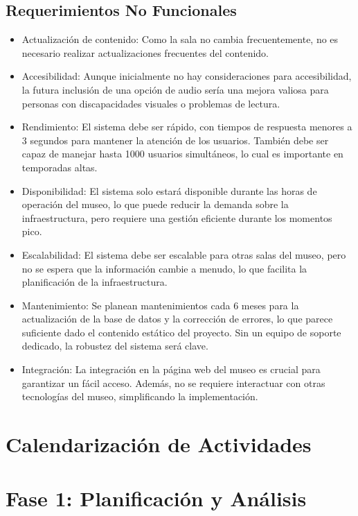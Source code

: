 \documentclass{report}
\begin{document}
    \subsection*{Requerimientos No Funcionales}
    \begin{itemize}
        \item Actualización de contenido: Como la sala no cambia frecuentemente, no es necesario realizar actualizaciones frecuentes del contenido.
        \item Accesibilidad: Aunque inicialmente no hay consideraciones para accesibilidad, la futura inclusión de una opción de audio sería una mejora valiosa para personas con discapacidades visuales o problemas de lectura.
        \item Rendimiento: El sistema debe ser rápido, con tiempos de respuesta menores a 3 segundos para mantener la atención de los usuarios. También debe ser capaz de manejar hasta 1000 usuarios simultáneos, lo cual es importante en temporadas altas.
        \item Disponibilidad: El sistema solo estará disponible durante las horas de operación del museo, lo que puede reducir la demanda sobre la infraestructura, pero requiere una gestión eficiente durante los momentos pico.
        \item Escalabilidad: El sistema debe ser escalable para otras salas del museo, pero no se espera que la información cambie a menudo, lo que facilita la planificación de la infraestructura.
        \item Mantenimiento: Se planean mantenimientos cada 6 meses para la actualización de la base de datos y la corrección de errores, lo que parece suficiente dado el contenido estático del proyecto. Sin un equipo de soporte dedicado, la robustez del sistema será clave.
        \item Integración: La integración en la página web del museo es crucial para garantizar un fácil acceso. Además, no se requiere interactuar con otras tecnologías del museo, simplificando la implementación.
    \end{itemize}

    \newpage

    \section{Calendarización de Actividades}

    \section*{Fase 1: Planificación y Análisis}
\end{document}
